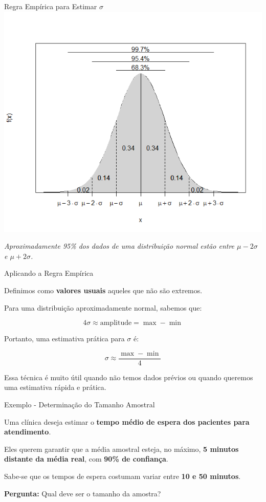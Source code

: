 \documentclass[14pt,aspectratio=1610]{beamer}
\begin{document}
\begin{frame}{Regra Empírica para Estimar $\sigma$}
	\centering
	\includegraphics[width=0.7\linewidth]{figs/ICEmpirico.png}
	
	\vspace{0.3cm}
	\small\textit{Aproximadamente 95\% dos dados de uma distribuição normal estão entre \(\mu - 2\sigma\) e \(\mu + 2\sigma\).}
\end{frame}

\begin{frame}{Aplicando a Regra Empírica}
	\vspace{-0.5cm}
		\small
	\begin{block}{}
		\justifying
		Definimos como \textbf{valores usuais} aqueles que não são extremos.
		
		Para uma distribuição aproximadamente normal, sabemos que:
		
		\[
		4\sigma \approx \text{amplitude} = \max - \min
		\]
		
		Portanto, uma estimativa prática para \(\sigma\) é:
		
		\[
		\sigma \approx \frac{\max - \min}{4}
		\]
		
		Essa técnica é muito útil quando não temos dados prévios ou quando queremos uma estimativa rápida e prática.
	\end{block}
\end{frame}
	
	\begin{frame}{Exemplo - Determinação do Tamanho Amostral}
		
		\begin{block}{}
			\justifying
			Uma clínica deseja estimar o \textbf{tempo médio de espera dos pacientes para atendimento}.
			
			Eles querem garantir que a média amostral esteja, no máximo, \textbf{5 minutos distante da média real}, com \textbf{90\% de confiança}.
			
			Sabe-se que os tempos de espera costumam variar entre \textbf{10 e 50 minutos}.
			
			\textbf{Pergunta:} Qual deve ser o tamanho da amostra?
			
		\end{block}
		
	\end{frame}
	
\end{document}
